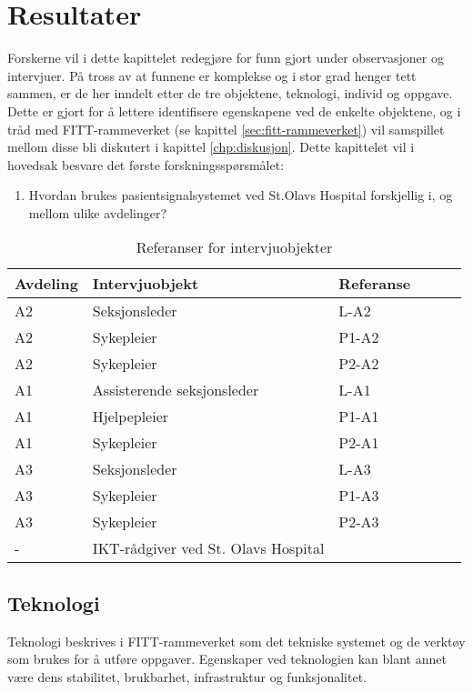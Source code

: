 \chapter{Resultater}
\label{chp:resultater} 

Forskerne vil i dette kapittelet redegjøre for funn gjort under observasjoner og intervjuer. På tross av at funnene er komplekse og i stor grad henger tett sammen, er de her inndelt etter de tre objektene, teknologi, individ og oppgave. Dette er gjort for å lettere identifisere egenskapene ved de enkelte objektene, og i tråd med FITT-rammeverket (se kapittel \ref{sec:fitt-rammeverket}) vil samspillet mellom disse bli diskutert i kapittel \ref{chp:diskusjon}. Dette kapittelet vil i hovedsak besvare det første forskningsspørsmålet:

\begin{enumerate}
\item Hvordan brukes pasientsignalsystemet ved St.Olavs Hospital forskjellig i, og mellom ulike avdelinger? 
\end{enumerate}

\begin{table}[H]\centering
    \begin{tabular}{ |l|l|l|l|l|l| }
    \hline
    Avdeling & Intervjuobjekt & Referanse \\ \hline
       A2 & Seksjonsleder & L-A2 \\ \hline
       A2 & Sykepleier & P1-A2 \\ \hline
       A2 & Sykepleier & P2-A2 \\ \hline
       A1 & Assisterende seksjonsleder & L-A1 \\ \hline
       A1 & Hjelpepleier & P1-A1 \\ \hline
       A1 & Sykepleier & P2-A1 \\ \hline
       A3 & Seksjonsleder & L-A3 \\ \hline
       A3 & Sykepleier & P1-A3 \\ \hline
       A3 & Sykepleier & P2-A3 \\ \hline
       - & IKT-rådgiver ved St. Olavs Hospital &  \\ \hline
    \end{tabular}
    \caption {Referanser for intervjuobjekter}
    \label{referanserintervju}
\end{table}

\section{Teknologi}
Teknologi beskrives i FITT-rammeverket som det tekniske systemet og de verktøy som brukes for å utføre oppgaver. Egenskaper ved teknologien kan blant annet være dens stabilitet, brukbarhet, infrastruktur og funksjonalitet. 

